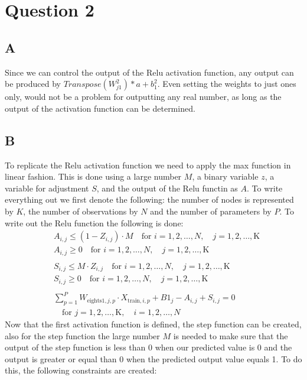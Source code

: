 \section{Question 2}
\subsection*{A}
Since we can control the output of the Relu activation function, any output can be produced by $Transpose(W_{j1}^2) * a + b_1^2$. Even setting the weights to just ones only, would not be a problem for outputting any real number, as long as the output of the activation function can be determined.
\subsection*{B}
To replicate the Relu activation function we need to apply the max function in linear fashion. This is done using a large number $M$, a binary variable $z$, a variable for adjustment $S$, and the output of the Relu functin as $A$. To write everything out we first denote the following: the number of nodes is represented by $K$, the number of observations by $N$ and the number of parameters by $P$. To write out the Relu function the following is done:
\begin{align*}
    &A_{i, j} \leq (1 - Z_{i, j}) \cdot M \quad \text{for } i = 1, 2, \ldots, N, \quad j = 1, 2, \ldots, \text{K} \\
    &A_{i, j} \geq 0 \quad \text{for } i = 1, 2, \ldots, N, \quad j = 1, 2, \ldots, \text{K} \\
    \\
    &S_{i, j} \leq M \cdot Z_{i, j} \quad \text{for } i = 1, 2, \ldots, N, \quad j = 1, 2, \ldots, \text{K} \\
    &S_{i, j} \geq 0 \quad \text{for } i = 1, 2, \ldots, N, \quad j = 1, 2, \ldots, \text{K} \\
    \\
    &\sum_{p=1}^{P} W_{\text{eights1}, j, p} \cdot X_{\text{train}, i, p} + B1_j - A_{i, j} + S_{i, j} = 0 \\
    &\quad \text{for } j = 1, 2, \ldots, \text{K}, \quad i = 1, 2, \ldots, N
\end{align*}
Now that the first activation function is defined, the step function can be created, also for the step function the large number $M$ is needed to make sure that the output of the step function is less than 0 when our predicted value is 0 and the output is greater or equal than 0 when the predicted output value equals 1. To do this, the following constraints are created:
